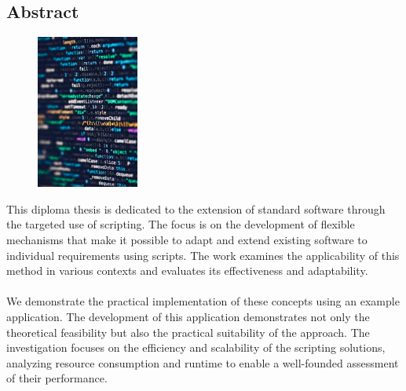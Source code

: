 \begin{spacing}{1}
    \chapter*{Abstract}
\end{spacing}
\begin{figure}
    \begin{center}
      \includegraphics[width=0.3\textwidth]{pics/coding.jpg}
    \end{center}
\end{figure}
This diploma thesis is dedicated to the extension of standard software through the targeted use of 
scripting. The focus is on the development of flexible mechanisms that make it possible to adapt 
and extend existing software to individual requirements using scripts. The work examines the 
applicability of this method in various contexts and evaluates its effectiveness and adaptability.
\\\\
We demonstrate the practical implementation of these concepts using an example application. The 
development of this application demonstrates not only the theoretical feasibility but also the 
practical suitability of the approach. The investigation focuses on the efficiency and scalability 
of the scripting solutions, analyzing resource consumption and runtime to enable a well-founded 
assessment of their performance.

